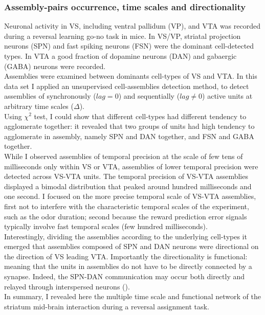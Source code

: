 \subsubsection{Assembly-pairs occurrence, time scales and directionality}
Neuronal activity in VS, including ventral pallidum (VP), and VTA was recorded during a reversal learning go-no task in mice. In VS/VP, striatal projection neurons (SPN) and fast spiking neurons (FSN) were the dominant cell-detected types. In VTA a good fraction of dopamine neurons (DAN) and  gabaergic (GABA) neurons were recorded.\\Assemblies were examined between dominants cell-types of VS and VTA. In this data set I applied an unsupervised cell-assemblies detection method, to detect assemblies of synchronously ($lag=0$) and sequentially ($lag\neq0$) active units at arbitrary time scales ($\Delta$).\\Using $\chi^2$ test, I could show that different cell-types had different tendency to agglomerate together: it revealed that two groups of units had high tendency to agglomerate in assembly, namely SPN and DAN together, and FSN and GABA together.\\While I observed assemblies of temporal precision at the scale of few tens of milliseconds only within VS or VTA, assemblies of lower temporal precision were detected across VS-VTA units. The temporal precision of VS-VTA assemblies displayed a bimodal distribution that peaked around hundred milliseconds and one second. I focused on the more precise temporal scale of VS-VTA assemblies, first not to interfere with the characteristic temporal scales of the experiment, such as the odor duration; second because the reward prediction error signals typically involve fast temporal scales (few hundred milliseconds).\\Interestingly, dividing the assemblies according to the underlying cell-types it emerged that assemblies composed of SPN and DAN neurons were directional on the direction of VS leading VTA. Importantly the directionality is functional: meaning that the units in assemblies do not have to be directly connected by a synapse. Indeed, the SPN-DAN communication may occur both directly and relayed through interspersed neurons (\cite{Ikemoto}).\\In summary, I revealed here the multiple time scale and functional network of the striatum mid-brain interaction during a reversal assignment task.  
   
